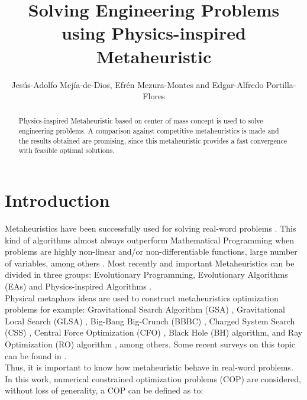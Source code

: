 \documentclass[12pt,letterpape]{article}
\title{Solving Engineering Problems using Physics-inspired Metaheuristic}
\author{Jesús-Adolfo Mejía-de-Dios, Efrén Mezura-Montes and Edgar-Alfredo Portilla-Flores
}
\begin{document}
\maketitle

\begin{abstract}
	Physics-inspired Metaheuristic based on center of mass concept is used to solve
	engineering problems. A comparison against competitive metaheuristics
	is made and the results obtained are promising, since this metaheuristic provides
	a fast convergence with feasible optimal solutions.
\end{abstract}

\section{Introduction} %
\label{sec:introduction}

Metaheuristics have been successfully used for solving real-word problems \cite{easSurv}.
This kind of algorithms almost always outperform Mathematical Programming when problems
are highly non-linear and/or non-differentiable functions, large number of variables, 
among others \cite{problemas}. Most recently and important Metaheuristics can be divided in three
groups: Evolutionary Programming, Evolutionary Algorithms (EAs) and Physics-inspired
Algorithms \cite{biswas2013physics, easSurv, DBLP:journals/corr/FisterYFBF13,spall03}.\\

Physical metaphors ideas are used to construct metaheuristics optimization problems
for example: Gravitational  Search Algorithm (GSA) \cite{rashedi2009gsa}, 
Gravitational Local Search (GLSA) \cite{glsa}, Big-Bang Big-Crunch (BBBC) \cite{erol2006new}, 
Charged System Search (CSS) \cite{kaveh2010novel}, Central Force Optimization 
(CFO) \cite{cfo2007}, Black Hole (BH) \cite{hatamlou2013black} algorithm, and Ray 
Optimization (RO) algorithm \cite{kaveh2012new}, among others. Some recent surveys 
on this topic can be found in
\cite{fisicaSurvey,biswas2013physics,DBLP:journals/corr/FisterYFBF13,xie2011convergence}. \\

Thus, it is important to know how metaheuristic behave in real-word problems.
In this work, numerical constrained optimization problems (COP) are considered,
without loss of generality, a COP can be defined as to:\\
\end{document}
